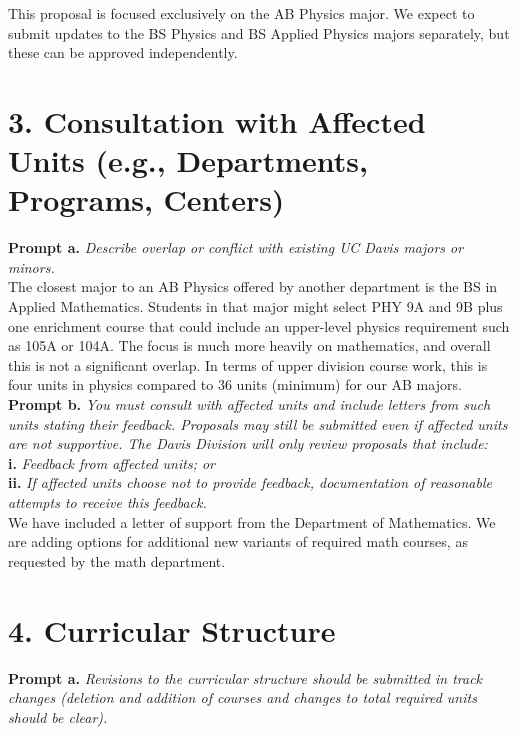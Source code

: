 \documentclass[12pt]{article}
\begin{document}
\noindent
This proposal is focused exclusively on the AB Physics major.  We expect
to submit updates to the BS Physics and BS Applied Physics majors
separately, but these can be approved independently.

\section*{3. Consultation with Affected Units (e.g., Departments, Programs, Centers)}

{\bf Prompt a.} {\it Describe overlap or conflict with existing UC Davis majors or minors.}\\

\noindent
The closest major to an AB Physics offered by another department is the
BS in Applied Mathematics.  Students in that major might select PHY 9A
and 9B plus one enrichment course that could include an upper-level
physics requirement such as 105A or 104A.  The focus is much more
heavily on mathematics, and overall this is not a significant overlap.
In terms of upper division course work, this is four units in physics
compared to 36 units (minimum) for our AB majors.\\[5pt]

\noindent
{\bf Prompt b.} {\it You must consult with affected units and include letters from such units stating their feedback. Proposals may still be submitted even if affected units are not supportive. The Davis Division will only review proposals that include:}\\
{\bf i.} {\it Feedback from affected units; or}\\
{\bf ii.} {\it If affected units choose not to provide feedback, documentation of reasonable attempts to receive this feedback.}\\

\noindent
We have included a letter of support from the Department of Mathematics.  We are adding options for
additional new variants of required math courses, as requested by the math department.

\section*{4. Curricular Structure}

\noindent
{\bf Prompt a.} {\it Revisions to the curricular structure should be submitted in track changes (deletion and addition of courses and changes to total required units should be clear).}\\
\end{document}

